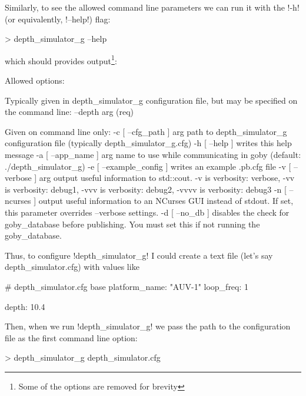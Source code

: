 Similarly, to see the allowed command line parameters we can run it with the !-h! (or equivalently, !--help!) flag:
\begin{boxedverbatim}
> depth_simulator_g --help
\end{boxedverbatim}
\resetbvlinenumber

which should provides output\footnote{Some of the options are removed for brevity}:
\begin{boxedverbatim}
Allowed options:

Typically given in depth_simulator_g configuration file,
but may be specified on the command line:
  --depth arg            (req)

Given on command line only:
  -c [ --cfg_path ] arg    path to depth_simulator_g configuration file 
                           (typically depth_simulator_g.cfg)
  -h [ --help ]            writes this help message
  -a [ --app_name ] arg    name to use while communicating in goby (default: 
                           ./depth_simulator_g)
  -e [ --example_config ]  writes an example .pb.cfg file
  -v [ --verbose ] arg     output useful information to std::cout. -v is 
                           verbosity: verbose, -vv is verbosity: debug1, -vvv 
                           is verbosity: debug2, -vvvv is verbosity: debug3
  -n [ --ncurses ]         output useful information to an NCurses GUI instead 
                           of stdout. If set, this parameter overrides 
                           --verbose settings.
  -d [ --no_db ]           disables the check for goby_database before 
                           publishing. You must set this if not running the 
                           goby_database.
\end{boxedverbatim}
\resetbvlinenumber

Thus, to configure !depth_simulator_g! I could create a text file (let's say depth\_simulator.cfg) with values like
\begin{boxedverbatim}
# depth_simulator.cfg
base
{
    platform_name: "AUV-1"
    loop_freq: 1
}

depth: 10.4
\end{boxedverbatim}
\resetbvlinenumber

Then, when we run !depth_simulator_g! we pass the path to the configuration file as the first command line option:
\begin{boxedverbatim}
> depth_simulator_g depth_simulator.cfg 
\end{boxedverbatim}
\resetbvlinenumber

